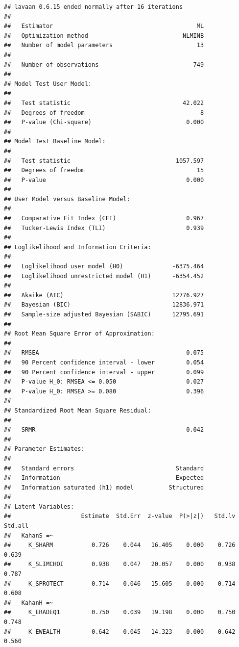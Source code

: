 \documentclass[
]{article}
\begin{document}
\begin{verbatim}
## lavaan 0.6.15 ended normally after 16 iterations
## 
##   Estimator                                         ML
##   Optimization method                           NLMINB
##   Number of model parameters                        13
## 
##   Number of observations                           749
## 
## Model Test User Model:
##                                                       
##   Test statistic                                42.022
##   Degrees of freedom                                 8
##   P-value (Chi-square)                           0.000
## 
## Model Test Baseline Model:
## 
##   Test statistic                              1057.597
##   Degrees of freedom                                15
##   P-value                                        0.000
## 
## User Model versus Baseline Model:
## 
##   Comparative Fit Index (CFI)                    0.967
##   Tucker-Lewis Index (TLI)                       0.939
## 
## Loglikelihood and Information Criteria:
## 
##   Loglikelihood user model (H0)              -6375.464
##   Loglikelihood unrestricted model (H1)      -6354.452
##                                                       
##   Akaike (AIC)                               12776.927
##   Bayesian (BIC)                             12836.971
##   Sample-size adjusted Bayesian (SABIC)      12795.691
## 
## Root Mean Square Error of Approximation:
## 
##   RMSEA                                          0.075
##   90 Percent confidence interval - lower         0.054
##   90 Percent confidence interval - upper         0.099
##   P-value H_0: RMSEA <= 0.050                    0.027
##   P-value H_0: RMSEA >= 0.080                    0.396
## 
## Standardized Root Mean Square Residual:
## 
##   SRMR                                           0.042
## 
## Parameter Estimates:
## 
##   Standard errors                             Standard
##   Information                                 Expected
##   Information saturated (h1) model          Structured
## 
## Latent Variables:
##                    Estimate  Std.Err  z-value  P(>|z|)   Std.lv  Std.all
##   KahanS =~                                                             
##     K_SHARM           0.726    0.044   16.405    0.000    0.726    0.639
##     K_SLIMCHOI        0.938    0.047   20.057    0.000    0.938    0.787
##     K_SPROTECT        0.714    0.046   15.605    0.000    0.714    0.608
##   KahanH =~                                                             
##     K_ERADEQ1         0.750    0.039   19.198    0.000    0.750    0.748
##     K_EWEALTH         0.642    0.045   14.323    0.000    0.642    0.560

\end{verbatim}
\end{document}
